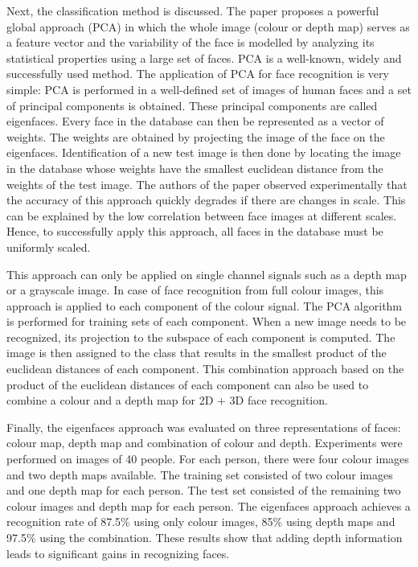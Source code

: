 \documentclass[]{article}
\begin{document}
Next, the classification method is discussed. The paper proposes a powerful global approach (PCA) in which the whole image (colour or depth map) serves as a feature vector and the variability of the face is modelled by analyzing its statistical properties using a large set of faces. PCA is a well-known, widely and successfully used method. The application of PCA for face recognition is very simple: PCA is performed in a well-defined set of images of human faces and a set of principal components is obtained. These principal components are called eigenfaces. Every face in the database can then be represented as a vector of weights. The weights are obtained by projecting the image of the face on the eigenfaces. Identification of a new test image is then done by locating the image in the database whose weights have the smallest euclidean distance from the weights of the test image. The authors of the paper observed experimentally that the accuracy of this approach quickly degrades if there are changes in scale. This can be explained by the low correlation between face images at different scales. Hence, to successfully apply this approach, all faces in the database must be uniformly scaled.

This approach can only be applied on single channel signals such as a depth map or a grayscale image. In case of face recognition from full colour images, this approach is applied to each component of the colour signal. The PCA algorithm is performed for training sets of each component. When a new image needs to be recognized, its projection to the subspace of each component is computed. The image is then assigned to the class that results in the smallest product of the euclidean distances of each component. This combination approach based on the product of the euclidean distances of each component can also be used to combine a colour and a depth map for 2D + 3D face recognition.

Finally, the eigenfaces approach was evaluated on three representations of faces: colour map, depth map and combination of colour and depth. Experiments were performed on images of 40 people. For each person, there were four colour images and two depth maps available. The training set consisted of two colour images and one depth map for each person. The test set consisted of the remaining two colour images and depth map for each person. The eigenfaces approach achieves a recognition rate of 87.5\% using only colour images, 85\% using depth maps and 97.5\% using the combination. These results show that adding depth information leads to significant gains in recognizing faces.
\end{document}
